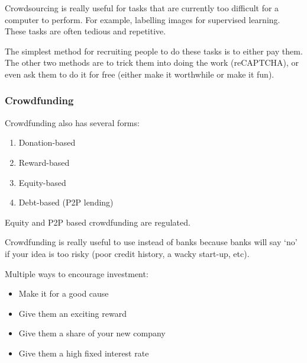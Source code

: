 \documentclass[11pt,a4paper,titlepage,dvipsnames,cmyk]{scrartcl}
\begin{document}
Crowdsourcing is really useful for tasks that are currently too difficult for a computer to perform. For example, labelling images for supervised learning. These tasks are often tedious and repetitive.

The simplest method for recruiting people to do these tasks is to either pay them. The other two methods are to trick them into doing the work (reCAPTCHA), or even ask them to do it for free (either make it worthwhile or make it fun).

\subsubsection{Crowdfunding}
Crowdfunding also has several forms:
\begin{enumerate}
\item Donation-based
\item Reward-based
\item Equity-based
\item Debt-based (P2P lending)
\end{enumerate}

Equity and P2P based crowdfunding are regulated.

Crowdfunding is really useful to use instead of banks because banks will say `no' if your idea is too risky (poor credit history, a wacky start-up, etc).

Multiple ways to encourage investment:
\begin{itemize}
    \item Make it for a good cause
    \item Give them an exciting reward
    \item Give them a share of your new company
    \item Give them a high fixed interest rate
\end{itemize}
\end{document}

